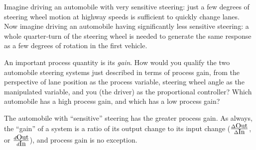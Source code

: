

Imagine driving an automobile with very sensitive steering: just a few degrees of steering wheel motion at highway speeds is sufficient to quickly change lanes.  Now imagine driving an automobile having significantly less sensitive steering: a whole quarter-turn of the steering wheel is needed to generate the same response as a few degrees of rotation in the first vehicle.

An important process quantity is its {\it gain}.  How would you qualify the two automobile steering systems just described in terms of process gain, from the perspective of lane position as the process variable, steering wheel angle as the manipulated variable, and you (the driver) as the proportional controller?  Which automobile has a high process gain, and which has a low process gain?







The automobile with ``sensitive'' steering has the greater process gain.  As always, the ``gain'' of a system is a ratio of its output change to its input change ($\Delta \hbox{Out} \over \Delta \hbox{In}$, or $d \hbox{Out} \over d \hbox{In}$), and process gain is no exception.











